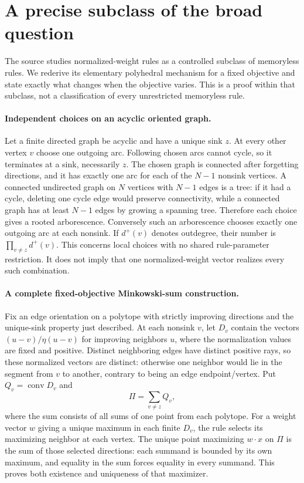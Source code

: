 \documentclass[11pt]{article}
\begin{document}
\section{A precise subclass of the broad question}
The source studies normalized-weight rules as a controlled subclass
of memoryless rules. We rederive its elementary polyhedral mechanism
for a fixed objective and state exactly what changes when the
objective varies. This is a proof within that subclass, not a
classification of every unrestricted memoryless rule.

\paragraph{Independent choices on an acyclic oriented graph.}
Let a finite directed graph be acyclic and have a unique sink $z$.
At every other vertex $v$ choose one outgoing arc. Following
chosen arcs cannot cycle, so it terminates at a sink, necessarily
$z$. The chosen graph is connected after forgetting directions,
and it has exactly one arc for each of the $N-1$ nonsink
vertices. A connected undirected graph on $N$ vertices with
$N-1$ edges is a tree: if it had a cycle, deleting one cycle
edge would preserve connectivity, while a connected graph has at
least $N-1$ edges by growing a spanning tree. Therefore each
choice gives a rooted arborescence. Conversely such an arborescence
chooses exactly one outgoing arc at each nonsink. If $d^+(v)$
denotes outdegree, their number is
$\prod_{v\ne z}d^+(v)$. This concerns local choices with no
shared rule-parameter restriction. It does not imply that one
normalized-weight vector realizes every such combination.

\paragraph{A complete fixed-objective Minkowski-sum construction.}
Fix an edge orientation on a polytope with strictly improving
directions and the unique-sink property just described. At each
nonsink $v$, let $D_v$ contain the vectors
$(u-v)/\eta(u-v)$ for improving neighbors $u$, where the
normalization values are fixed and positive. Distinct neighboring
edges have distinct positive rays, so these normalized vectors
are distinct: otherwise one neighbor would lie in the segment
from $v$ to another, contrary to being an edge endpoint/vertex.
Put $Q_v=\operatorname{conv}D_v$ and
\[
\Pi=\sum_{v\ne z}Q_v,
\]
where the sum consists of all sums of one point from each polytope.
For a weight vector $w$ giving a unique maximum in each finite
$D_v$, the rule selects its maximizing neighbor at each vertex.
The unique point maximizing $w\cdot x$ on $\Pi$ is the
sum of those selected directions: each summand is bounded by its
own maximum, and equality in the sum forces equality in every
summand. This proves both existence and uniqueness of that maximizer.
\end{document}
